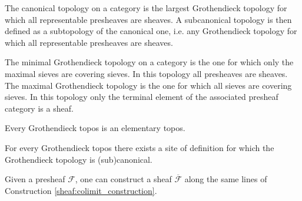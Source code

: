     \begin{example}
        The canonical topology on a category is the largest Grothendieck topology for which all representable presheaves are sheaves. A subcanonical topology is then defined as a subtopology of the canonical one, i.e. any Grothendieck topology for which all representable presheaves are sheaves.
    \end{example}
    \begin{example}
        The minimal Grothendieck topology on a category is the one for which only the maximal sieves are covering sieves. In this topology all presheaves are sheaves. The maximal Grothendieck topology is the one for which all sieves are covering sieves. In this topology only the terminal element of the associated presheaf category is a sheaf.
    \end{example}

    \begin{property}
        Every Grothendieck topos is an elementary topos.
    \end{property}

    \begin{property}
        For every Grothendieck topos there exists a site of definition for which the Grothendieck topology is (sub)canonical.
    \end{property}

    \begin{construct}[Sheafification]
        Given a presheaf $\mathcal{F}$, one can construct a sheaf $\overline{\mathcal{F}}$ along the same lines of Construction \ref{sheaf:colimit_construction}.
    \end{construct}


